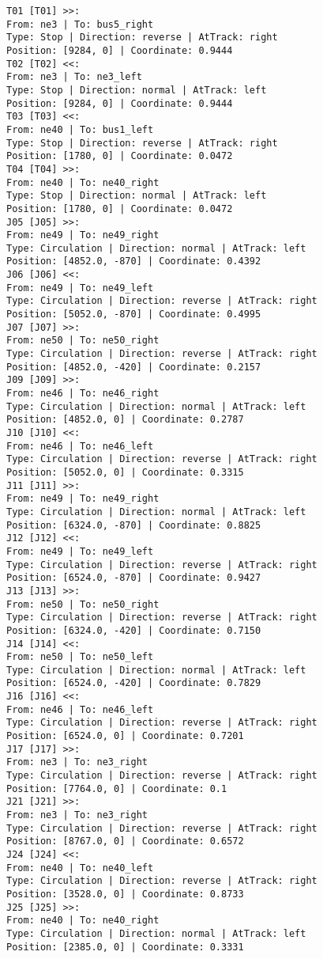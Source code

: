 	\begin{lstlisting}[language = {}, caption = Signalling.RNA, label = {lst:EJ9_6}]
T01 [T01] >>:
From: ne3 | To: bus5_right
Type: Stop | Direction: reverse | AtTrack: right 
Position: [9284, 0] | Coordinate: 0.9444
T02 [T02] <<:
From: ne3 | To: ne3_left
Type: Stop | Direction: normal | AtTrack: left 
Position: [9284, 0] | Coordinate: 0.9444
T03 [T03] <<:
From: ne40 | To: bus1_left
Type: Stop | Direction: reverse | AtTrack: right 
Position: [1780, 0] | Coordinate: 0.0472
T04 [T04] >>:
From: ne40 | To: ne40_right
Type: Stop | Direction: normal | AtTrack: left 
Position: [1780, 0] | Coordinate: 0.0472
J05 [J05] >>:
From: ne49 | To: ne49_right
Type: Circulation | Direction: normal | AtTrack: left 
Position: [4852.0, -870] | Coordinate: 0.4392
J06 [J06] <<:
From: ne49 | To: ne49_left
Type: Circulation | Direction: reverse | AtTrack: right 
Position: [5052.0, -870] | Coordinate: 0.4995
J07 [J07] >>:
From: ne50 | To: ne50_right
Type: Circulation | Direction: reverse | AtTrack: right 
Position: [4852.0, -420] | Coordinate: 0.2157
J09 [J09] >>:
From: ne46 | To: ne46_right
Type: Circulation | Direction: normal | AtTrack: left 
Position: [4852.0, 0] | Coordinate: 0.2787
J10 [J10] <<:
From: ne46 | To: ne46_left
Type: Circulation | Direction: reverse | AtTrack: right 
Position: [5052.0, 0] | Coordinate: 0.3315
J11 [J11] >>:
From: ne49 | To: ne49_right
Type: Circulation | Direction: normal | AtTrack: left 
Position: [6324.0, -870] | Coordinate: 0.8825
J12 [J12] <<:
From: ne49 | To: ne49_left
Type: Circulation | Direction: reverse | AtTrack: right 
Position: [6524.0, -870] | Coordinate: 0.9427
J13 [J13] >>:
From: ne50 | To: ne50_right
Type: Circulation | Direction: reverse | AtTrack: right 
Position: [6324.0, -420] | Coordinate: 0.7150
J14 [J14] <<:
From: ne50 | To: ne50_left
Type: Circulation | Direction: normal | AtTrack: left 
Position: [6524.0, -420] | Coordinate: 0.7829
J16 [J16] <<:
From: ne46 | To: ne46_left
Type: Circulation | Direction: reverse | AtTrack: right 
Position: [6524.0, 0] | Coordinate: 0.7201
J17 [J17] >>:
From: ne3 | To: ne3_right
Type: Circulation | Direction: reverse | AtTrack: right 
Position: [7764.0, 0] | Coordinate: 0.1
J21 [J21] >>:
From: ne3 | To: ne3_right
Type: Circulation | Direction: reverse | AtTrack: right 
Position: [8767.0, 0] | Coordinate: 0.6572
J24 [J24] <<:
From: ne40 | To: ne40_left
Type: Circulation | Direction: reverse | AtTrack: right 
Position: [3528.0, 0] | Coordinate: 0.8733
J25 [J25] >>:
From: ne40 | To: ne40_right
Type: Circulation | Direction: normal | AtTrack: left 
Position: [2385.0, 0] | Coordinate: 0.3331

\end{lstlisting}
